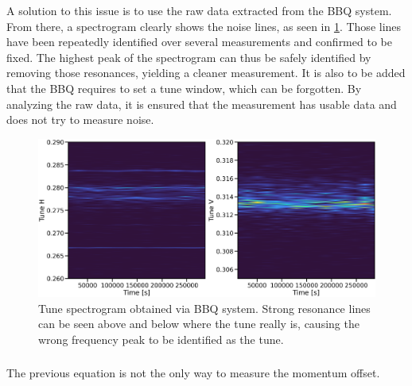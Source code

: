 A solution to this issue is to use the raw data extracted from the BBQ system. From there, a
spectrogram clearly shows the noise lines, as seen in \cref{fig:decapoles:chromaticity:spectrogram}.
Those lines have been repeatedly identified over several measurements and confirmed to be fixed.
The highest peak of the spectrogram can thus be safely identified by removing those resonances,
yielding a cleaner measurement. It is also to be added that the BBQ requires to set a tune window,
which can be forgotten. By analyzing the raw data, it is ensured that the measurement has usable
data and does not try to measure noise.

\begin{figure}[tbh]
    \includegraphics[width=\textwidth]{./images/spectrogram.png}
    \caption{Tune spectrogram obtained via BBQ system. Strong resonance lines can be seen above and
    below where the tune really is, causing the wrong frequency peak to be identified as the tune.}
    \label{fig:decapoles:chromaticity:spectrogram}
\end{figure}


\subsubsection{}

The previous equation is not the only way to measure the momentum offset.
\\


%
%
%

